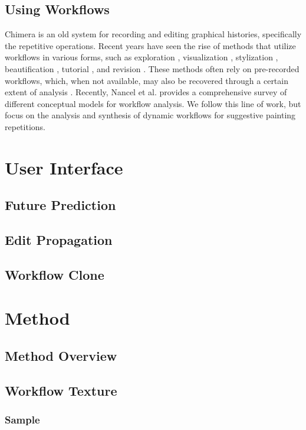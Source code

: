 \subsection{Using Workflows}
Chimera \cite{bib1} is an old system for recording and editing graphical histories, specifically the repetitive operations. Recent years have seen the rise of methods that utilize workflows in various forms, such as exploration \cite{bib1}, visualization  \cite{bib1} \cite{bib1} \cite{bib1} \cite{bib1}, stylization \cite{bib1}, beautification \cite{bib1}, tutorial  \cite{bib1} \cite{bib1}, and revision \cite{bib1}. These methods often rely on pre-recorded workflows, which, when not available, may also be recovered through a certain extent of analysis  \cite{bib1} \cite{bib1} \cite{bib1} \cite{bib1}. Recently, Nancel et al. \cite{bib1} provides a comprehensive survey of different conceptual models for workflow analysis.
We follow this line of work, but focus on the analysis and synthesis of dynamic workflows for suggestive painting repetitions.

\section{User Interface}
\subsection{Future Prediction}
\subsection{Edit Propagation}
\subsection{Workflow Clone}

\section{Method}

\subsection{Method Overview}

\subsection{Workflow Texture}
\subsubsection{Sample}
